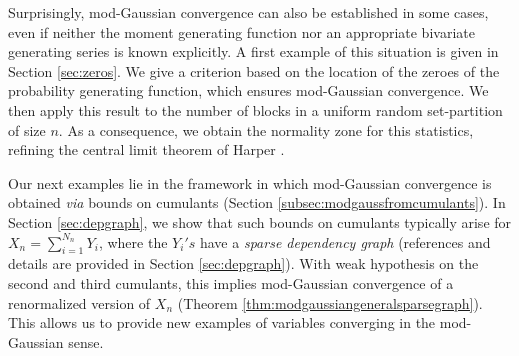 \documentclass[12pt,a4paper,reqno]{amsart}
\theoremstyle{remark}
\begin{document}
Surprisingly, mod-Gaussian convergence can also be established in some cases,
even if neither the moment generating function nor an appropriate bivariate generating series is known explicitly.
A first example of this situation is given in Section \ref{sec:zeros}.
We give a criterion based on the location of the zeroes of the probability generating function,
which ensures mod-Gaussian convergence. We then apply this result to the number of blocks in a uniform random set-partition of size $n$. As a consequence, we obtain the normality zone for this statistics,
refining the central limit theorem of Harper \cite{HarperCLTBlocks}.
\medskip

Our next examples lie in the framework in which mod-Gaussian convergence
is obtained {\em via} bounds on cumulants (Section \ref{subsec:modgaussfromcumulants}). 
In Section \ref{sec:depgraph}, we show that such bounds on cumulants typically arise 
for $X_n=\sum_{i=1}^{N_n} Y_i$,
where the $Y_i's$ have a {\em sparse dependency graph}
 (references and details are provided in Section \ref{sec:depgraph}).
With weak hypothesis on the second and third cumulants, this implies mod-Gaussian convergence of a renormalized version of $X_n$
(Theorem \ref{thm:modgaussiangeneralsparsegraph}).
This allows us to provide new examples of variables converging in the mod-Gaussian sense.\vspace{2mm}
%
%
\end{document}
